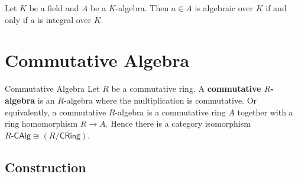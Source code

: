 Let $K$ be a field and $A$ be a $K$-algebra. Then $a\in A$ is algebraic over $K$ if and only if $a$ is integral over $K$.


\section{Commutative Algebra}
\begin{definition}{Commutative Algebra}{}
    Let $R$ be a commutative ring. A \textbf{commutative $R$-algebra} is an $R$-algebra where the multiplication is commutative. Or equivalently, a commutative $R$-algebra is a commutative ring $A$ together with a ring homomorphism $R\to A$. Hence there is a category isomorphism $R\text{-}\mathsf{CAlg}\cong \left(R/\mathsf{CRing}\right)$.
\end{definition}

\subsection{Construction}

